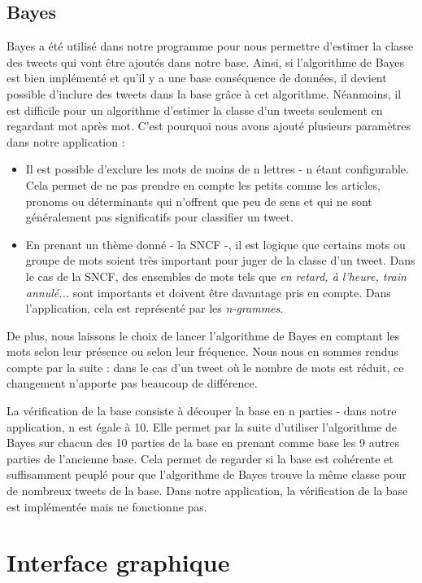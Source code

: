 \documentclass[a4paper,10pt]{report}
\begin{document}
    \subsection{Bayes}
      Bayes a été utilisé dans notre programme pour nous permettre d'estimer la classe des tweets qui vont être ajoutés dans notre base. Ainsi, si l'algorithme de Bayes est bien implémenté et qu'il y a une base conséquence de données, il devient possible d'inclure des tweets dans la base grâce à cet algorithme.
      Néanmoins, il est difficile pour un algorithme d'estimer la classe d'un tweets seulement en regardant mot après mot. C'est pourquoi nous avons ajouté plusieurs paramètres dans notre application :
      \begin{itemize}
	    \item Il est possible d'exclure les mots de moins de n lettres - n étant configurable. Cela permet de ne pas prendre en compte les petits comme les articles, pronoms ou déterminants qui n'offrent que peu de sens et qui ne sont généralement pas significatifs pour classifier un tweet. 
	    \item En prenant un thème donné - la SNCF -, il est logique que certains mots ou groupe de mots soient très important pour juger de la classe d'un tweet. Dans le cas de la SNCF, des ensembles de mots tels que \textit{en retard, à l'heure, train annulé...} sont importants et doivent être davantage pris en compte. Dans l'application, cela est représenté par les \textit{n-grammes}.
      \end{itemize}
      De plus, nous laissons le choix de lancer l'algorithme de Bayes en comptant les mots selon leur présence ou selon leur fréquence.
      Nous nous en sommes rendus compte par la suite : dans le cas d'un tweet où le nombre de mots est réduit, ce changement n'apporte pas beaucoup de différence.
      
      La vérification de la base consiste à découper la base en n parties - dans notre application, n est égale à 10.
      Elle permet par la suite d'utiliser l'algorithme de Bayes sur chacun des 10 parties de la base en prenant comme base les 9 autres parties de l'ancienne base.
      Cela permet de regarder si la base est cohérente et suffisamment peuplé pour que l'algorithme de Bayes trouve la même classe pour de nombreux tweets de la base.
      Dans notre application, la vérification de la base est implémentée mais ne fonctionne pas.

  \section{Interface graphique}
\end{document}
